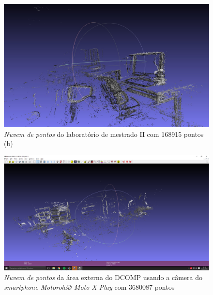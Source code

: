 \begin{figure}[H]
	\centering
		\includegraphics[width= \textwidth]{Imagens/figura4-14.jpg}
	\caption{\textit{Nuvem de pontos} do laboratório de mestrado II com 168915 pontos (b)}
	\label{fig4:14}
\end{figure}

\begin{figure}[H]
	\centering
		\includegraphics[width= \textwidth]{Imagens/dcompMotox.PNG}
	\caption{\textit{Nuvem de pontos} da área externa do DCOMP usando a câmera do \textit{smartphone Motorola® Moto X Play} com 3680087 pontos}
\end{figure}

